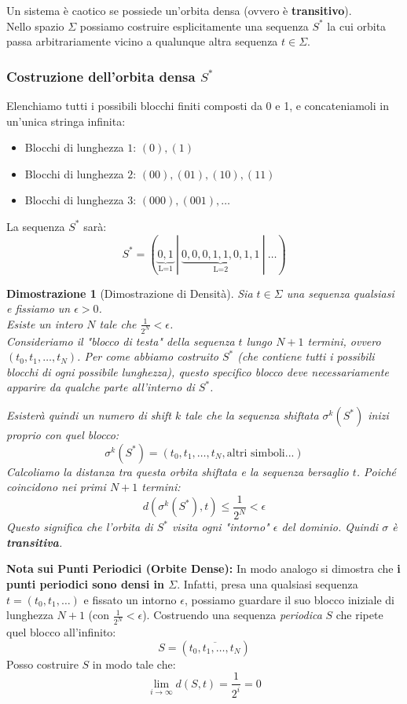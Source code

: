 \documentclass[openany]{book}
\newtheorem*{dimostrazione}{Dimostrazione}
\theoremstyle{definition}
\theoremstyle{remark}
\begin{document}
Un sistema è caotico se possiede un'orbita densa (ovvero è \textbf{transitivo}). \\
Nello spazio $\Sigma$ possiamo costruire esplicitamente una sequenza $S^*$ la cui orbita passa arbitrariamente vicino a qualunque altra sequenza $t \in \Sigma$.

\subsubsection*{Costruzione dell'orbita densa $S^*$}
Elenchiamo tutti i possibili blocchi finiti composti da 0 e 1, e concateniamoli in un'unica stringa infinita:
\begin{itemize}
    \item Blocchi di lunghezza $1$: \quad $(0), (1)$
    \item Blocchi di lunghezza $2$: \quad $(00), (01), (10), (11)$
    \item Blocchi di lunghezza $3$: \quad $(000), (001), \dots$
\end{itemize}

La sequenza $S^*$ sarà:
$$ S^* = ( \underbrace{0, 1}_{\text{L=1}} \ | \ \underbrace{0, 0, 0, 1, 1, 0, 1, 1}_{\text{L=2}} \ | \ \dots ) $$

\begin{dimostrazione}[Dimostrazione di Densità]
Sia $t \in \Sigma$ una sequenza qualsiasi e fissiamo un $\epsilon > 0$. \\
Esiste un intero $N$ tale che $\frac{1}{2^N} < \epsilon$. \\
Consideriamo il "blocco di testa" della sequenza $t$ lungo $N+1$ termini, ovvero $(t_0, t_1, \dots, t_N)$. 
Per come abbiamo costruito $S^*$ (che contiene \emph{tutti} i possibili blocchi di ogni possibile lunghezza), questo specifico blocco deve necessariamente apparire da qualche parte all'interno di $S^*$.

Esisterà quindi un numero di shift $k$ tale che la sequenza shiftata $\sigma^k(S^*)$ inizi proprio con quel blocco:
$$ \sigma^k(S^*) = (t_0, t_1, \dots, t_N, \text{altri simboli...}) $$
Calcoliamo la distanza tra questa orbita shiftata e la sequenza bersaglio $t$. Poiché coincidono nei primi $N+1$ termini:
$$ d(\sigma^k(S^*), t) \leq \frac{1}{2^N} < \epsilon $$
Questo significa che l'orbita di $S^*$ visita ogni "intorno" $\epsilon$ del dominio. Quindi $\sigma$ è \textbf{transitiva}.
\end{dimostrazione}
\vspace{1em}

\textbf{Nota sui Punti Periodici (Orbite Dense):}
In modo analogo si dimostra che \textbf{i punti periodici sono densi in $\Sigma$}. 
Infatti, presa una qualsiasi sequenza $t = (t_0, t_1, \dots)$ e fissato un intorno $\epsilon$, possiamo guardare il suo blocco iniziale di lunghezza $N+1$ (con $\frac{1}{2^N} < \epsilon$). Costruendo una sequenza \emph{periodica} $S$ che ripete quel blocco all'infinito:
$$ S = (\overline{t_0, t_1, \dots, t_N}) $$
Posso costruire $S$ in modo tale che:
$$ \lim_{i \to \infty} d(S, t) = \frac{1}{2^i} = 0 $$
\end{document}
